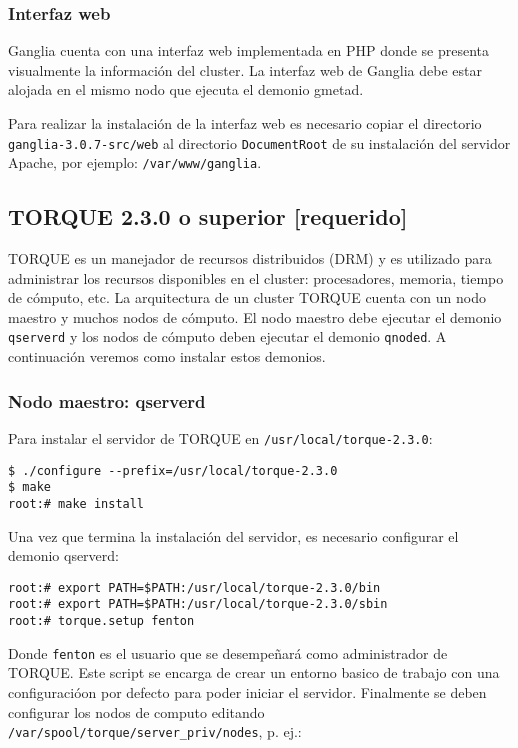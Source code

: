 \documentclass[a4paper,10pt,spanish]{article}
\begin{document}
\subsubsection{Interfaz web}

Ganglia cuenta con una interfaz web implementada en PHP donde se presenta visualmente la informaci\'{o}n del cluster. La interfaz web de Ganglia debe estar alojada en el mismo nodo que ejecuta el demonio gmetad.

Para realizar la instalaci\'{o}n de la interfaz web es necesario copiar el directorio \mbox{\texttt{ganglia-3.0.7-src/web}} al directorio \texttt{DocumentRoot} de su instalaci\'{o}n del servidor Apache, por ejemplo: \mbox{\texttt{/var/www/ganglia}}.

\subsection{TORQUE 2.3.0 o superior \small{[requerido]}}

TORQUE\cite{torque} es un manejador de recursos distribuidos (DRM) y es utilizado para administrar los recursos disponibles en el cluster: procesadores, memoria, tiempo de c\'{o}mputo, etc. La arquitectura de un cluster TORQUE cuenta con un nodo maestro y muchos nodos de c\'{o}mputo. El nodo maestro debe ejecutar el demonio \texttt{qserverd} y los nodos de c\'{o}mputo deben ejecutar el demonio \texttt{qnoded}. A continuaci\'{o}n veremos como instalar estos demonios.

\subsubsection{Nodo maestro: qserverd}

Para instalar el servidor de TORQUE en \mbox{\texttt{/usr/local/torque-2.3.0}}:

\begin{verbatim}
$ ./configure --prefix=/usr/local/torque-2.3.0 
$ make 
root:# make install
\end{verbatim}

Una vez que termina la instalaci\'{o}n del servidor, es necesario configurar el demonio qserverd:

\begin{verbatim}
root:# export PATH=$PATH:/usr/local/torque-2.3.0/bin
root:# export PATH=$PATH:/usr/local/torque-2.3.0/sbin
root:# torque.setup fenton
\end{verbatim}

Donde \mbox{\texttt{fenton}} es el usuario que se desempe\~{n}ar\'{a} como administrador de TORQUE. Este script se encarga de crear un entorno basico de trabajo con una configuraci\'{o}on por defecto para poder iniciar el servidor. Finalmente se deben configurar los nodos de computo editando \mbox{\texttt{/var/spool/torque/server\_priv/nodes}}, p. ej.:
\end{document}
